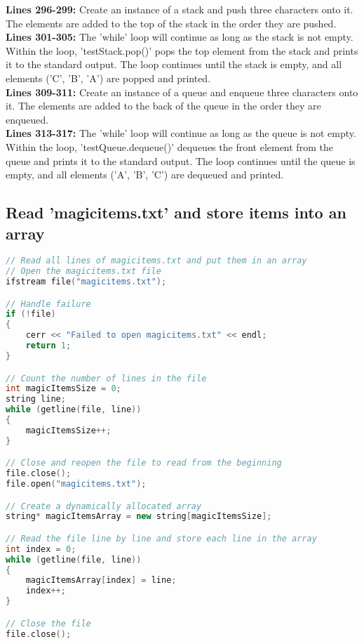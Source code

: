 \documentclass[letterpaper, 10pt,DIV=13]{scrartcl}
\numberwithin{equation}{section} %
\numberwithin{figure}{section} %
\numberwithin{table}{section} %
\begin{document}
\textbf{Lines 296-299:} Create an instance of a stack and push three characters onto it. The elements are added to the top of the stack in the order they are pushed. \\
\textbf{Lines 301-305:} The 'while' loop will continue as long as the stack is not empty.
Within the loop, 'testStack.pop()' pops the top element from the stack and prints it to the standard output. The loop continues until the stack is empty, and all elements ('C', 'B', 'A') are popped and printed. \\
\textbf{Lines 309-311:} Create an instance of a queue and enqueue three characters onto it. The elements are added to the back of the queue in the order they are enqueued. \\
\textbf{Lines 313-317:} The 'while' loop will continue as long as the queue is not empty. Within the loop, 'testQueue.dequeue()' dequeues the front element from the queue and prints it to the standard output. The loop continues until the queue is empty, and all elements ('A', 'B', 'C') are dequeued and printed.

\subsection{Read 'magicitems.txt' and store items into an array}
\begin{linenumbers}
\begin{lstlisting}[language=C++, caption={Store Items in Array}, label={code:example}]
// Read all lines of magicitems.txt and put them in an array
// Open the magicitems.txt file
ifstream file("magicitems.txt");

// Handle failure
if (!file) 
{
    cerr << "Failed to open magicitems.txt" << endl;
    return 1;
}

// Count the number of lines in the file
int magicItemsSize = 0;
string line;
while (getline(file, line)) 
{
    magicItemsSize++;
}

// Close and reopen the file to read from the beginning
file.close();
file.open("magicitems.txt");

// Create a dynamically allocated array
string* magicItemsArray = new string[magicItemsSize];

// Read the file line by line and store each line in the array
int index = 0;
while (getline(file, line)) 
{
    magicItemsArray[index] = line;
    index++;
}

// Close the file
file.close();
\end{lstlisting}
\end{linenumbers}
\nolinenumbers
\end{document}
